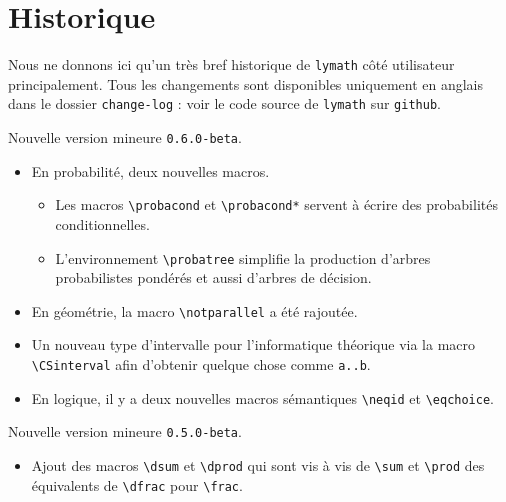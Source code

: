 \documentclass[12pt,a4paper]{article}
\begin{document}
\newpage

\section{Historique}

Nous ne donnons ici qu'un très bref historique de \verb+lymath+ côté utilisateur principalement.
Tous les changements sont disponibles uniquement en anglais dans le dossier \verb+change-log+ : voir le code source de \verb+lymath+ sur \verb+github+.

\begin{description}[leftmargin=1em]
    \setlength\itemsep{1em}



    \item[2019-10-10] Nouvelle version mineure \verb+0.6.0-beta+.
    \begin{itemize}
        \item En probabilité, deux nouvelles macros.
        \begin{itemize}
            \item Les macros \verb+\probacond+ et \verb+\probacond*+ servent à écrire des probabilités conditionnelles.

            \item L'environnement \verb+\probatree+ simplifie la production d'arbres probabilistes pondérés et aussi d'arbres de décision.
        \end{itemize}

        \item En géométrie, la macro \verb+\notparallel+ a été rajoutée.

        \item Un nouveau type d'intervalle pour l'informatique théorique via la macro \verb+\CSinterval+ afin d'obtenir quelque chose comme \verb+a..b+.

        \item En logique, il y a deux nouvelles macros sémantiques \verb+\neqid+ et \verb+\eqchoice+.
    \end{itemize}



    \item[2019-09-27] Nouvelle version mineure \verb+0.5.0-beta+.
    \begin{itemize}
        \item Ajout des macros \verb+\dsum+ et \verb+\dprod+ qui sont vis à vis de \verb+\sum+ et \verb+\prod+ des équivalents de \verb+\dfrac+ pour \verb+\frac+.


\end{itemize}
\end{description}
\end{document}
